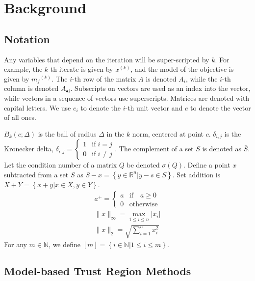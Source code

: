\documentclass{article}
\theoremstyle{case}
\numberwithin{theorem}{subsection}
\newcommand{\mfk}{{{m}_f}^{(k)}}
\newcommand{\naturals}{\mathbb N}
\newcommand{\Rn}{\mathbb R^n}
\newcommand{\xk}{x^{(k)}}
\begin{document}
\section{Background}

\subsection{Notation}

Any variables that depend on the iteration will be super-scripted by $k$.
For example, the $k$-th iterate is given by $\xk$, and the model of the objective is given by $\mfk$.
The $i$-th row of the matrix $A$ is denoted $A_i$, while the $i$-th column is denoted $A_{\bullet i}$.
Subscripts on vectors are used as an index into the vector, while vectors in a sequence of vectors use superscripts.
Matrices are denoted with capital letters.
We use $e_i$ to denote the $i$-th unit vector and $e$ to denote the vector of all ones.

$B_k(c; \Delta)$ is the ball of radius $\Delta$ in the $k$ norm, centered at point $c$.
$\delta_{i,j}$ is the Kronecker delta, $\delta_{i, j} = \begin{cases} 1 & \textrm{if} \; i = j \\ 0 & \textrm{if} \; i \ne j \end{cases}$.
The complement of a set $S$ is denoted as $\bar S$.
Let the condition number of a matrix $Q$ be denoted $\sigma(Q)$.
Define a point $x$ subtracted from a set $S$ as $S - x = \left\{y \in \Rn | y - s \in S\right\}$.
Set addition is $X + Y = \left\{x + y | x \in X, y \in Y\right\}$.
\begin{align*}
a^+ = \begin{cases} a & \textrm{if} \quad a \ge 0 \\ 0 & \textrm{otherwise} \end{cases}\\
\|x\|_{\infty} = \max_{1\le i\le n}|x_i| \\
\|x\|_{2} = \sqrt{\sum_{i=1}^n x_i^2}
\end{align*}
For any $m \in \naturals$, we define $[m] = \left\{i \in \naturals | 1 \le i \le m\right\}$.

\subsection{Model-based Trust Region Methods}
\end{document}
